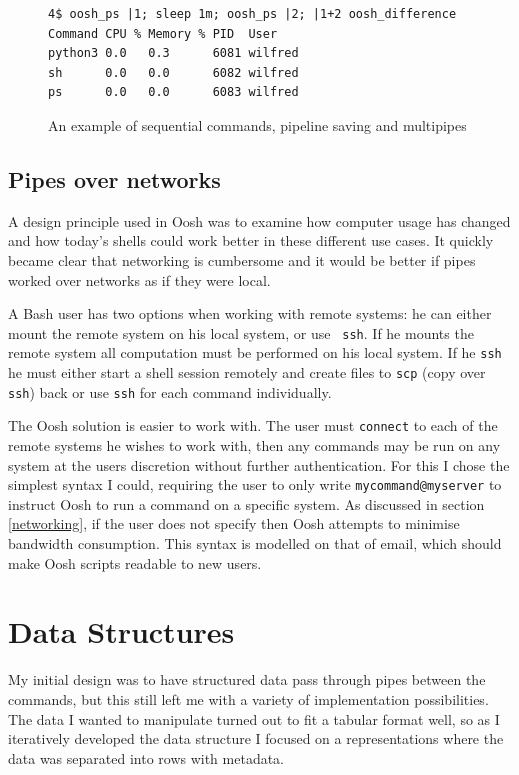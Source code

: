 \documentclass[12pt,twoside,notitlepage]{report}
\begin{document}
\begin{figure}
\caption{An example of sequential commands, pipeline saving and multipipes}
\begin{verbatim}
4$ oosh_ps |1; sleep 1m; oosh_ps |2; |1+2 oosh_difference
Command CPU % Memory % PID  User
python3 0.0   0.3      6081 wilfred
sh      0.0   0.0      6082 wilfred
ps      0.0   0.0      6083 wilfred
\end{verbatim}
\end{figure}

\subsection{Pipes over networks}

A design principle used in Oosh was to examine how computer usage has
changed and how today's shells could work better in these different
use cases. It quickly became clear that networking is cumbersome and
it would be better if pipes worked over networks as if they were
local.

A Bash user has two options when working with remote systems: he can
either mount the remote system on his local system, or use {\tt
  ssh}. If he mounts the remote system all computation must be
performed on his local system. If he {\tt ssh} he must either start a
shell session remotely and create files to {\tt scp} (copy over {\tt
  ssh}) back or use {\tt ssh} for each command individually.

The Oosh solution is easier to work with. The user must {\tt connect}
to each of the remote systems he wishes to work with, then any
commands may be run on any system at the users discretion without
further authentication. For this I chose the simplest syntax I could,
requiring the user to only write {\tt mycommand@myserver} to instruct
Oosh to run a command on a specific system. As discussed in section
\ref{networking}, if the user does not specify then Oosh attempts to
minimise bandwidth consumption. This syntax is modelled on that of
email, which should make Oosh scripts readable to new users.

\section{Data Structures}
My initial design was to have structured data pass through pipes between the
commands, but this still left me with a variety of implementation
possibilities. The data I wanted to manipulate turned out to fit a tabular
format well, so as I iteratively developed the data structure I
focused on a representations where the data was separated into rows
with metadata.
\end{document}
